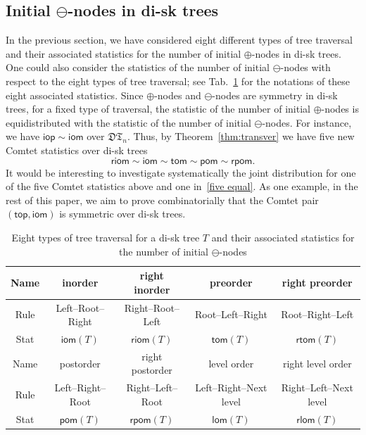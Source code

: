 \documentclass[12pt]{amsart}
\numberwithin{equation}{section}
\theoremstyle{plain}
\theoremstyle{definition}
\newcommand{\DT}{\mathfrak{DT}}
\def\iop{\mathsf{iop}}
\def\top{\mathsf{top}}
\def\iom{\mathsf{iom}}
\def\tom{\mathsf{tom}}
\def\riom{\mathsf{riom}}
\def\rtom{\mathsf{rtom}}
\def\pom{\mathsf{pom}}
\def\lom{\mathsf{lom}}
\def\rpom{\mathsf{rpom}}
\def\rlom{\mathsf{rlom}}
\begin{document}





\subsection{Initial $\ominus$-nodes in di-sk trees}


In the previous section, we have considered eight different types of  tree  traversal and their associated statistics for the number of initial $\oplus$-nodes in di-sk trees. One could also consider the statistics of the number of initial $\ominus$-nodes with respect to the  eight types of tree traversal; see Tab.~\ref{eight-tree-omi} for the notations of these eight associated statistics. Since $\oplus$-nodes and $\ominus$-nodes are symmetry in di-sk trees, for  a fixed type of traversal,  the statistic of the number of initial $\oplus$-nodes is equidistributed with the statistic of  the number of initial $\ominus$-nodes. For instance, we have $\iop\sim\iom$ over $\DT_n$. Thus, by Theorem~\ref{thm:transver} we have five new Comtet statistics over di-sk trees
$$
\riom\sim\iom\sim\tom\sim\pom\sim\rpom.
$$
It would be interesting to investigate systematically the joint distribution for one of the five Comtet statistics above and one in~\eqref{five equal}. As one example, in the rest of this paper,  we aim to prove combinatorially that the Comtet pair $(\top,\iom)$ is symmetric over di-sk trees. 


\begin{table}[bp]\caption{Eight types of tree traversal for a di-sk tree $T$ and their associated statistics for the number of initial $\ominus$-nodes}\label{eight-tree-omi}
\centering
\begin{tabular}{|c||c|c|c|c|}
\hline
Name & inorder & right inorder & preorder & right preorder \\
\hline
Rule & Left--Root--Right & Right--Root--Left & Root--Left--Right & Root--Right--Left \\
\hline
Stat & $\iom(T)$ & $\riom(T)$ & $\tom(T)$ & $\rtom(T)$ \\
\hline
Name & postorder & right postorder & level order & right level order \\
\hline
Rule & Left--Right--Root & Right--Left--Root & Left--Right--Next level & Right--Left--Next level \\
\hline
Stat & $\pom(T)$ & $\rpom(T)$ & $\lom(T)$ & $\rlom(T)$ \\
\hline
\end{tabular}
\end{table}
\end{document}
